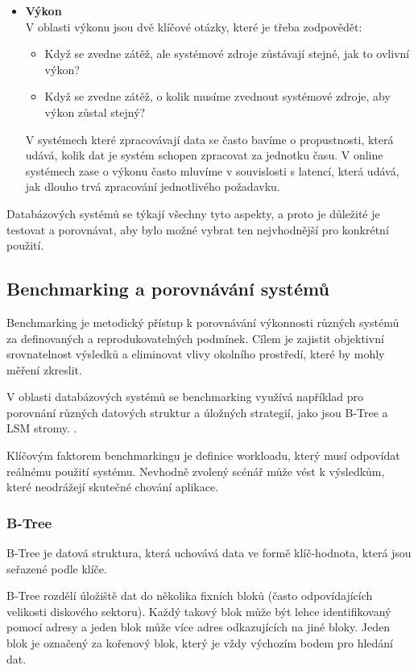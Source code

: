 \begin{itemize}
    \item \textbf{Výkon} \\
    V oblasti výkonu jsou dvě klíčové otázky, které je třeba zodpovědět:
    \begin{itemize}
        \item Když se zvedne zátěž, ale systémové zdroje zůstávají stejné, jak to ovlivní výkon?
        \item Když se zvedne zátěž, o kolik musíme zvednout systémové zdroje, aby výkon zůstal stejný?
    \end{itemize}

    V systémech které zpracovávají data se často bavíme o propustnosti, která udává, kolik dat je systém schopen zpracovat za jednotku času.
    V online systémech zase o výkonu často mluvíme v souvislosti s latencí, která udává, jak dlouho trvá zpracování jednotlivého požadavku. \cite{kleppmann2017designing}
\end{itemize}

Databázových systémů se týkají všechny tyto aspekty, a proto je důležité je testovat a porovnávat, aby bylo možné vybrat ten nejvhodnější pro konkrétní použití.

\subsection{Benchmarking a porovnávání systémů}

Benchmarking je metodický přístup k porovnávání výkonnosti různých systémů za definovaných a
reprodukovatelných podmínek. Cílem je zajistit objektivní srovnatelnost výsledků a eliminovat
vlivy okolního prostředí, které by mohly měření zkreslit.

V oblasti databázových systémů se benchmarking využívá například pro porovnání různých
datových struktur a úložných strategií, jako jsou B-Tree a LSM stromy. \cite{kleppmann2017designing}.

Klíčovým faktorem benchmarkingu je definice workloadu, který musí odpovídat reálnému použití
systému. Nevhodně zvolený scénář může vést k výsledkům, které neodrážejí skutečné chování
aplikace.

\subsubsection{B-Tree}
B-Tree je datová struktura, která uchovává data ve formě klíč-hodnota, která jsou seřazené podle klíče.

B-Tree rozdělí úložiště dat do několika fixních bloků (často odpovídajících velikosti diskového sektoru).
Každý takový blok může být lehce identifikovaný pomocí adresy a jeden blok může více adres odkazujících na jiné bloky. \cite{kleppmann2017designing}
Jeden blok je označený za kořenový blok, který je vždy výchozím bodem pro hledání dat.

